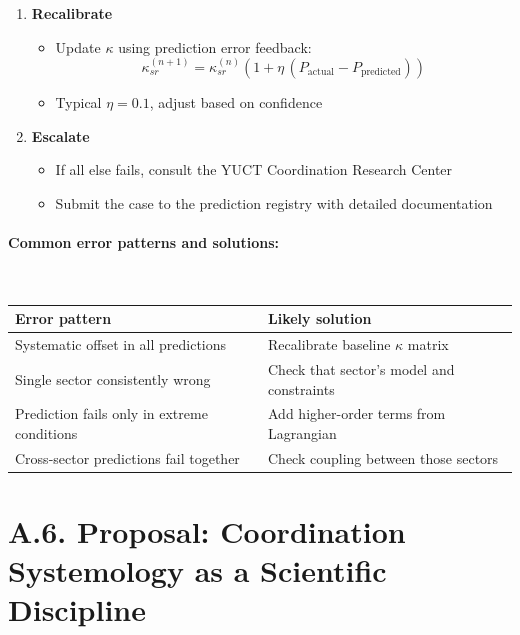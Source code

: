 \documentclass[13pt,a4paper]{article}
\begin{document}
\begin{enumerate}
		\item \textbf{Recalibrate}
		\begin{itemize}
			\item Update \(\kappa\) using prediction error feedback:
			\[
			\kappa_{sr}^{(n+1)} = \kappa_{sr}^{(n)}\left(1+\eta\,(P_{\mathrm{actual}}-P_{\mathrm{predicted}})\right)
			\]
			\item Typical \(\eta = 0.1\), adjust based on confidence
		\end{itemize}
		
		\item \textbf{Escalate}
		\begin{itemize}
			\item If all else fails, consult the YUCT Coordination Research Center
			\item Submit the case to the prediction registry with detailed documentation
		\end{itemize}
	\end{enumerate}
	
	\paragraph*{Common error patterns and solutions:} \
	
	\begin{tabularx}{\textwidth}{|l|X|}
		\hline
		\textbf{Error pattern} & \textbf{Likely solution} \\
		\hline
		Systematic offset in all predictions & Recalibrate baseline \(\kappa\) matrix \\
		\hline
		Single sector consistently wrong & Check that sector's model and constraints \\
		\hline
		Prediction fails only in extreme conditions & Add higher-order terms from Lagrangian \\
		\hline
		Cross-sector predictions fail together & Check coupling between those sectors \\
		\hline
	\end{tabularx}
	
	\section*{A.6. Proposal: Coordination Systemology as a Scientific Discipline}
	
\end{document}
